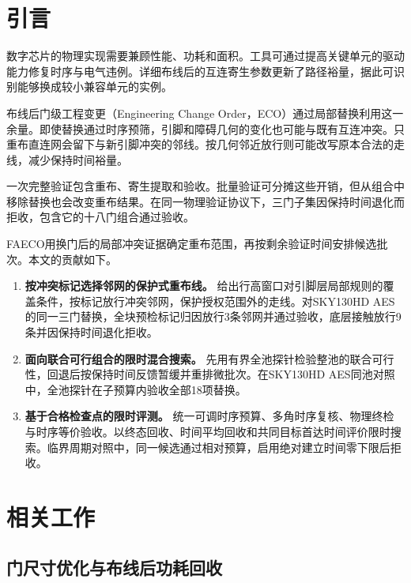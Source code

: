\documentclass[twocolumn,10pt,fontset=windows]{ctexart}
\begin{document}
\section{引言}

数字芯片的物理实现需要兼顾性能、功耗和面积。工具可通过提高关键单元的驱动能力修复时序与电气违例\cite{chinnery2002closing,openroad}。详细布线后的互连寄生参数更新了路径裕量，据此可识别能够换成较小兼容单元的实例。

布线后门级工程变更（Engineering Change Order，ECO）通过局部替换利用这一余量\cite{lee2012eco,fatemi2019sizer,cheng2023dagsizer}。即使替换通过时序预筛，引脚和障碍几何的变化也可能与既有互连冲突。只重布直连网会留下与新引脚冲突的邻线。按几何邻近放行则可能改写原本合法的走线，减少保持时间裕量。

一次完整验证包含重布、寄生提取和验收。批量验证可分摊这些开销，但从组合中移除替换也会改变重布结果。在同一物理验证协议下，三门子集因保持时间退化而拒收，包含它的十八门组合通过验收。

FAECO用换门后的局部冲突证据确定重布范围，再按剩余验证时间安排候选批次。本文的贡献如下。
\begin{enumerate}
\setlength{\itemsep}{2pt}
\item \textbf{按冲突标记选择邻网的保护式重布线。} 给出行高窗口对引脚层局部规则的覆盖条件，按标记放行冲突邻网，保护授权范围外的走线。对SKY130HD AES的同一三门替换，全块预检标记归因放行3条邻网并通过验收，底层接触放行9条并因保持时间退化拒收。
\item \textbf{面向联合可行组合的限时混合搜索。} 先用有界全池探针检验整池的联合可行性，回退后按保持时间反馈暂缓并重排微批次。在SKY130HD AES同池对照中，全池探针在子预算内验收全部18项替换。
\item \textbf{基于合格检查点的限时评测。} 统一可调时序预算、多角时序复核、物理终检与时序等价验收。以终态回收、时间平均回收和共同目标首达时间评价限时搜索。临界周期对照中，同一候选通过相对预算，启用绝对建立时间零下限后拒收。
\end{enumerate}

\section{相关工作}

\subsection{门尺寸优化与布线后功耗回收}
\end{document}
